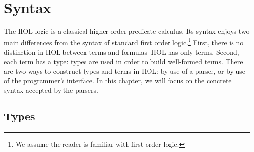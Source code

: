 \chapter{Syntax}
{
 \newcommand{\term}      {\mbox{\it term}}
 \newcommand{\IMP}       {\mbox{\tt ==>}}
 \newcommand{\ALL}       {\mbox{\tt !}}
 \newcommand{\EXISTS}    {\mbox{\tt ?}}
 \newcommand{\CHOOSE}    {\mbox{\tt @}}
 \newcommand{\EXISTSONE} {\mbox{\tt ?!}}
 \newcommand{\LET}       {\mbox{\tt let}}
 \newcommand{\und}       {\mbox{\tt and}}
 \newcommand{\IN}        {\mbox{\tt in}}
 \newcommand{\CONS}      {\mbox{\tt CONS}}
 \newcommand{\INSERT}    {\mbox{\tt INSERT}}
 \newcommand{\SUC}       {\mbox{\tt SUC}}
 \newcommand{\vstr}      {\mbox{\it vstr}}
 \newcommand{\numeral}   {\mbox{\it numeral}}
 \newcommand{\charseq}   {\mbox{\it charseq}}

The HOL logic is a classical higher-order predicate calculus. Its
syntax enjoys two main differences from the syntax of standard first
order logic.\footnote{We assume the reader is familiar with first
  order logic.}  First, there is no distinction in HOL between terms
and formulas: HOL has only terms. Second, each term has a type: types
are used in order to build well-formed terms. There are two ways to
construct types and terms in HOL: by use of a parser, or by use of the
programmer's interface. In this chapter, we will focus on the concrete
syntax accepted by the parsers.


\section{Types}

}
